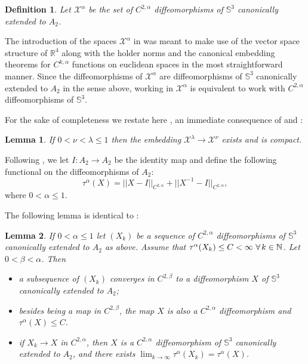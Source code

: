 \documentclass{article}
\def\S3{{\mathbb S^3}}
\newtheorem{lemma}{Lemma}[section]
\newtheorem{definition}{Definition}[section]
\begin{document}
\begin{definition}\label{dxcal} Let $\mathcal{X}^\alpha$ be the set of  $C^{2,\alpha}$ diffeomorphisms of  $\S3$ canonically extended to $A_2$.
\end{definition}

The introduction of the spaces $\mathcal X^\alpha$ in \cite{p1} was meant to  make use of the vector space 
structure of $\mathbb R^4$ along with the  holder norms and the canonical embedding theorems for $C^{k,\alpha}$ functions on euclidean spaces in the most straightforward manner. Since the diffeomorphisms of $\mathcal X^\alpha$ are diffeomorphisms of $\S3$ canonically extended to $A_2$ in the sense above, working in $\mathcal X^\alpha$ is equivalent to work with $C^{2,\alpha}$ diffeomorphisms of $\S3$.

For the sake of completeness we restate here \cite[Lem 4.1]{p1}, an immediate consequence of \cite[Rem. 4.1]{p1} and \cite[Th. 3.1]{ad}: 


\begin{lemma}\label{lemb}  If  $0<\nu<\lambda\leq 1$  then the embedding $\mathcal{X}^\lambda\to \mathcal{X}^\nu$ exists and is compact. 
\end{lemma} 




Following \cite{p1},  we let  $I:A_2\to A_2$ be the identity map and define the following functional on the diffeomorphisms of $A_2$:
\begin{equation}
\tau^\alpha(X)= ||X-I||_{C^{2,\alpha}}+||X^{-1}-I||_{C^{2,\alpha}},
\end{equation}
where $0<\alpha\leq 1$.


The following lemma is identical to \cite[Lem. 4.2]{p1}:

\begin{lemma}\label{lbas}  If $0<\alpha\leq 1$ let $(X_k)$ be a sequence of $C^{2,\alpha}$ diffeomorphisms of $\S3$ canonically extended to $A_2$ as above. Assume that $\tau^\alpha(X_k)\leq C<\infty\ \forall\hspace{.02in}k\in \mathbb N$.  Let  $0<\beta<\alpha$. Then 
\begin{itemize}
\item[(i)] a subsequence of $(X_k)$ converges  in
$C^{2,\beta}$ to a diffeomorphism $X$ of $\S3$ canonically extended to $A_2$; 
\item[(ii)] besides being a map in $C^{2,\beta}$, the map $X$ is also a $C^{2,\alpha}$ diffeomorphism and ${\tau^{\alpha}(X)}\leq C$. 
\item[(iii)] if $X_k \to X$ in $C^{2,\alpha}$, then $X$ is a $C^{2,\alpha}$ diffeomorphism of $\S3$ canonically extended to $A_2$, and there exists $\lim_{k\to\infty}\tau^\alpha(X_k)=\tau^\alpha(X)$.
\end{itemize}
\end{lemma}
\end{document}
